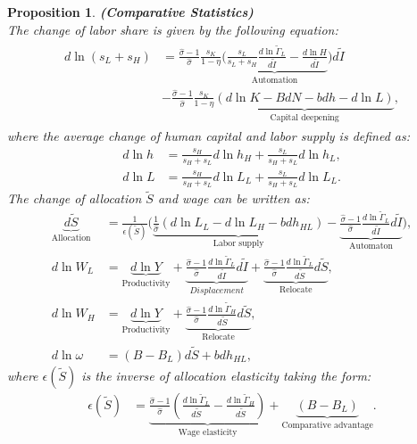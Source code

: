 \documentclass[12pt]{article}
\newtheorem{proposition}{Proposition}
\begin{document}
\begin{proposition}{\bf (Comparative Statistics)} \\
The change of labor share is given by the following equation: 
\begin{align}
\label{ds_L}
\begin{split}
d\ln(s_{L}+s_{H}) &= \frac{\hat{\sigma}-1}{\hat{\sigma}}\frac{s_K}{1-\eta}\underbrace{( \frac{s_L}{s_L+s_H}\frac{d\ln\tilde{\Gamma}_L}{d\tilde{I}}-\frac{d\ln H}{d\tilde{I}}}_{\text{Automation}})d\tilde{I}\\
&-\frac{\hat{\sigma}-1}{\hat{\sigma}}\frac{s_K}{1-\eta}\underbrace{(d\ln K -BdN-bdh-d\ln L)}_{\text{Capital deepening}},
 \end{split}
\end{align}
where the average change of human capital and labor supply is defined as: 
\begin{align*}
d\ln h &= \frac{s_H}{s_H+s_L}d\ln h_H+\frac{s_L}{s_H+s_L}d\ln h_L,\\
d\ln L &= \frac{s_H}{s_H+s_L}d\ln L_L+\frac{s_L}{s_H+s_L}d\ln L_L.
\end{align*}
The change of allocation $\tilde{S}$ and wage can be written as: 
\begin{align}
\label{dS}
\underbrace{d\tilde{S}}_{\text{Allocation}} &= \frac{1}{\epsilon(\tilde{S})}\Big(\underbrace{\frac{1}{\hat{\sigma}}(d\ln L_L-d\ln L_H-bdh_{HL})}_{\text{Labor supply}}-\underbrace{\frac{\hat{\sigma}-1}{\hat{\sigma}}\frac{d\ln\tilde{\Gamma}_L}{d\tilde{I}}d\tilde{I}}_{\text{Automaton}}\Big),\\ 
\label{dW_L}
d \ln W_L &= \underbrace{d \ln Y}_{\text{Productivity}} + \underbrace{\frac{\hat{\sigma}-1}{\hat{\sigma}}\frac{d\ln\tilde{\Gamma}_L}{d\tilde{I}}d\tilde{I}}_{Displacement}+ \underbrace{\frac{\hat{\sigma}-1}{\hat{\sigma}}\frac{d\ln\tilde{\Gamma}_L}{d\tilde{S}}d\tilde{S}}_{\text{Relocate}},\\
\label{dW_H}
d \ln W_H &= \underbrace{d \ln Y}_{\text{Productivity}}  + \underbrace{\frac{\hat{\sigma}-1}{\hat{\sigma}}\frac{d\ln\tilde{\Gamma}_H}{d\tilde{S}}d\tilde{S}}_{\text{Relocate}}, \\
\label{dw}
d \ln \omega &=(B-B_L)d\tilde{S}+bdh_{HL},
\end{align}
where $\epsilon(\tilde{S})$ is the inverse of allocation elasticity taking the form:  
\begin{align}
\label{eS}
\epsilon(\tilde{S})&= \underbrace{\frac{\hat{\sigma}-1}{\hat{\sigma}}(\frac{d\ln \tilde{\Gamma}_L}{d\tilde{S}}-\frac{d\ln \tilde{\Gamma}_H}{d\tilde{S}})}_{\text{Wage elasticity}}
								 +\underbrace{(B-B_L)}_{\text{Comparative advantage}}.
\end{align}
\end{proposition}
\end{document}
